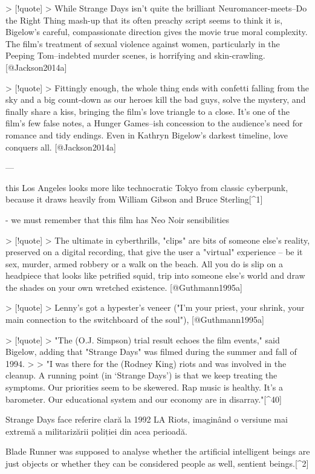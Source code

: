 \documentclass[12pt]{article}
\begin{document}
> [!quote]
> While Strange Days isn't quite the brilliant Neuromancer-meets–Do the Right Thing mash-up that its often preachy script seems to think it is, Bigelow's careful, compassionate direction gives the movie true moral complexity. The film's treatment of sexual violence against women, particularly in the Peeping Tom–indebted murder scenes, is horrifying and skin-crawling. [@Jackson2014a]

> [!quote]
> Fittingly enough, the whole thing ends with confetti falling from the sky and a big count-down as our heroes kill the bad guys, solve the mystery, and finally share a kiss, bringing the film's love triangle to a close. It's one of the film's few false notes, a Hunger Games–ish concession to the audience's need for romance and tidy endings. Even in Kathryn Bigelow's darkest timeline, love conquers all. [@Jackson2014a]

---

this Los Angeles looks more like technocratic Tokyo from classic cyberpunk, because it draws heavily from William Gibson and Bruce Sterling[^1]

- we must remember that this film has Neo Noir sensibilities

> [!quote]
> The ultimate in cyberthrills, "clips" are bits of someone else's reality, preserved on a digital recording, that give the user a "virtual" experience -- be it sex, murder, armed robbery or a walk on the beach. All you do is slip on a headpiece that looks like petrified squid, trip into someone else's world and draw the shades on your own wretched existence. [@Guthmann1995a]

> [!quote]
> Lenny's got a hypester's veneer ("I'm your priest, your shrink, your main connection to the switchboard of the soul"), [@Guthmann1995a]

> [!quote]
> "The (O.J. Simpson) trial result echoes the film events," said Bigelow, adding that "Strange Days" was filmed during the summer and fall of 1994.
>
> "I was there for the (Rodney King) riots and was involved in the cleanup. A running point (in `Strange Days') is that we keep treating the symptoms. Our priorities seem to be skewered. Rap music is healthy. It's a barometer. Our educational system and our economy are in disarray."[^40]

Strange Days face referire clară la 1992 LA Riots, imaginând o versiune mai extremă a militarizării poliției din acea perioadă. 

Blade Runner was supposed to analyse whether the artificial intelligent beings are just objects or whether they can be considered people as well, sentient beings.[^2]
\end{document}
